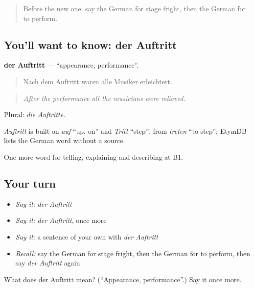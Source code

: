 \begin{quote}
Before the new one: say the German for stage fright, then the German for to perform.
\end{quote}

\subsection*{You'll want to know: der Auftritt}
\textbf{der Auftritt} — \textquotedblleft{}appearance, performance\textquotedblright{}.

\begin{quote}
Nach dem Auftritt waren alle Musiker erleichtert.
\end{quote}

\begin{quote}
\emph{After the performance all the musicians were relieved.}
\end{quote}

Plural: \emph{die Auftritte}.

\begin{cousinweb}
\emph{Auftritt} is built on \emph{auf} \textquotedblleft{}up, on\textquotedblright{} and \emph{Tritt} \textquotedblleft{}step\textquotedblright{}, from \emph{treten} \textquotedblleft{}to step\textquotedblright{}; EtymDB lists the German word without a source.
\end{cousinweb}

\begin{grammarlens}[title={What you've built}]
One more word for telling, explaining and describing at B1.
\end{grammarlens}

\subsection*{Your turn}
\begin{itemize}
\raggedright
  \item \emph{Say it:} \emph{der Auftritt}
  \item \emph{Say it:} \emph{der Auftritt}, once more
  \item \emph{Say it:} a sentence of your own with \emph{der Auftritt}
  \item \emph{Recall:} say the German for stage fright, then the German for to perform, then say \emph{der Auftritt} again
\end{itemize}

\begin{tcolorbox}[breakable,colback=teal!4,colframe=teal!35!black,title={Before you move on}]
What does der Auftritt mean? (\textquotedblleft{}Appearance, performance\textquotedblright{}.) Say it once more.
\end{tcolorbox}
